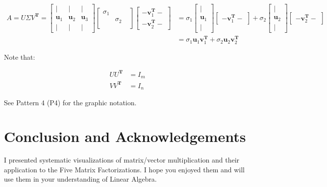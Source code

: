\documentclass[letterpaper]{article}
\begin{document}
\begin{align*}
  A = U \Sigma V^\mathbf{T} =
  \begin{bmatrix}
    | & | & |\\
    \bm{u}_1 & \bm{u}_2 & \bm{u}_3\\
    | & | & |
  \end{bmatrix}
  \begin{bmatrix}
    \sigma_1 \\
           & \sigma_2 \\
           & &
  \end{bmatrix}
  \begin{bmatrix}
  - \bm{v}_1^\mathbf{T} -\\
  - \bm{v}_2^\mathbf{T} -
  \end{bmatrix}
  & =
  \sigma_1 \begin{bmatrix}
    |\\
    \bm{u}_1\\
    |
  \end{bmatrix}
  \begin{bmatrix}
    - \bm{v}_1^\mathbf{T} - 
  \end{bmatrix}
  +
  \sigma_2 \begin{bmatrix}
  |\\
  \bm{u}_2\\
  |
  \end{bmatrix}
  \begin{bmatrix}
  - \bm{v}_2^\mathbf{T} -
  \end{bmatrix} \\
& = \sigma_1 \bm{u}_1 \bm{v}_1^\mathbf{T} + \sigma_2 \bm{u}_2 \bm{v}_2^\mathbf{T}
\end{align*}

Note that:

\begin{align*}
  U U^\mathbf{T} &= I_m \\
  V V^\mathbf{T} &= I_n
\end{align*}

See Pattern 4 (P4) for the graphic notation.

\section*{Conclusion and Acknowledgements}

I presented systematic visualizations of matrix/vector multiplication and
their application to the Five Matrix Factorizations. I hope you
enjoyed them and will use them
in your understanding of Linear Algebra.
\end{document}
